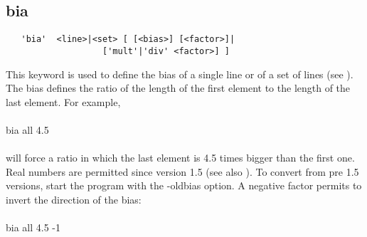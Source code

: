 \documentclass{article}
\begin{document}
\subsection{\label{bia}bia}
\begin{verbatim}
   'bia'  <line>|<set> [ [<bias>] [<factor>]|
                   ['mult'|'div' <factor>] ]
\end{verbatim}
This keyword is used to define the bias of a single line or of a set of lines (see ). The bias defines the ratio of the length of the first element to the length of the last element. For example,\\\\
bia all 4.5\\\\will force a ratio in which the last element is 4.5 times bigger than the first one. Real numbers are permitted since version 1.5 (see also ). To convert from pre 1.5 versions, start the program with the -oldbias option. A negative factor permits to invert the direction of the bias: \\\\
bia all 4.5 -1\\\\
\end{document}
